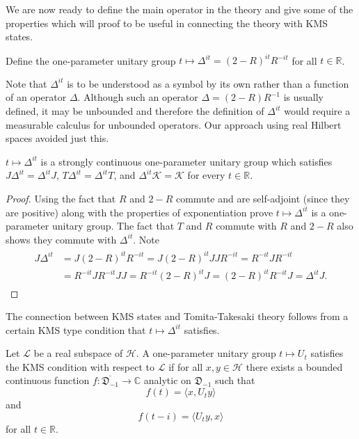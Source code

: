 We are now ready to define the main operator in the theory and give some of the properties which will proof to be useful in connecting the theory with KMS states.

\begin{definition}
Define the one-parameter unitary group $t\mapsto\Delta^{it} = (2-R)^{it}R^{-it}$ for all $t\in\mathbb{R}$.
\end{definition}

Note that $\Delta^{it}$ is to be understood as a symbol by its own rather than a function of an operator $\Delta$. Although such an operator $\Delta=(2-R)R^{-1}$ is usually defined, it may be unbounded and therefore the definition of $\Delta^{it}$ would require a measurable calculus for unbounded operators. Our approach using real Hilbert spaces avoided just this.

\begin{theorem}
$t\mapsto\Delta^{it}$ is a strongly continuous one-parameter unitary group which satisfies $J\Delta^{it}=\Delta^{it}J$, $T\Delta^{it}=\Delta^{it}T$, and $\Delta^{it}\mathcal{K}=\mathcal{K}$ for every $t\in\mathbb{R}$.
\end{theorem}

\begin{proof}
Using the fact that $R$ and $2-R$ commute and are self-adjoint (since they are positive) along with the properties of exponentiation prove $t\mapsto\Delta^{it}$ is a one-parameter unitary group. The fact that $T$ and $R$ commute with $R$ and $2-R$ also shows they commute with $\Delta^{it}$. Note
\begin{align}
\begin{split}
J\Delta^{it}&=J(2-R)^{it}R^{-it}=J(2-R)^{it}JJR^{-it}=R^{-it}JR^{-it} \\
&=R^{-it}JR^{-it}JJ=R^{-it}(2-R)^{it}J=(2-R)^{it} R^{-it}J=\Delta^{it}J.
\end{split}
\end{align}
\end{proof}

The connection between KMS states and Tomita-Takesaki theory follows from a certain KMS type condition that $t\mapsto\Delta^{it}$ satisfies.

\begin{definition}
Let $\mathcal{L}$ be a real subspace of $\mathcal{H}$. A one-parameter unitary group $t\mapsto U_t$ satisfies the KMS condition with respect to $\mathcal{L}$ if for all $x,y\in\mathcal{H}$ there exists a bounded continuous function $f:\overline{\mathfrak{D}_{-1}}\rightarrow\mathbb{C}$ analytic on $\mathfrak{D}_{-1}$ such that 
\begin{equation}
f(t) = \langle x, U_t y\rangle
\end{equation}
and
\begin{equation}
f(t-i)=\langle U_t y, x\rangle 
\end{equation}
for all $t\in\mathbb{R}$. 
\end{definition}

